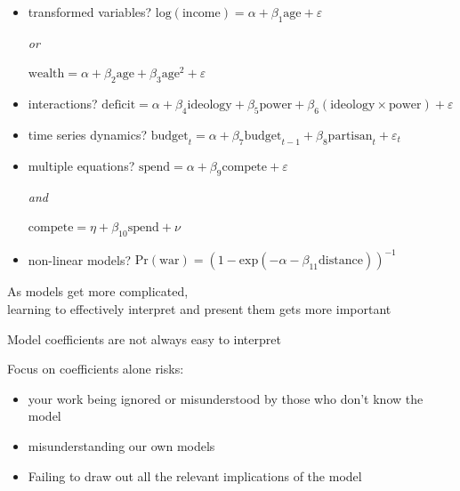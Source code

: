 \documentclass[pdflatex,landscape,titlepage]{foils}
\begin{document}
\begin{itemize}
\item transformed variables? \pause \quad 
  \color{green} $\mathrm{log}(\mathrm{income}) = \alpha +
  \beta_1\mathrm{age} + \varepsilon$  \pause

\quad \quad \quad \quad \quad  \quad \quad 
 \quad \quad \quad \quad \quad \quad \quad \quad \emph{or} 

 \quad \quad \quad \quad \quad  \quad \quad 
 \quad \quad \quad \quad $\mathrm{wealth} = \alpha + \beta_2\mathrm{age}+ \beta_3\mathrm{age}^2 + \varepsilon$
 \color{white} \pause

\item interactions? \pause \quad  \color{green}
  $\mathrm{deficit} = \alpha + \beta_4\mathrm{ideology} + \beta_5\mathrm{power} + \beta_6(\mathrm{ideology} \times
  \mathrm{power}) + \varepsilon$  \color{white} \pause

\item time series dynamics? \pause \quad  \color{green}
  $\mathrm{budget}_{t} = \alpha + \beta_7\mathrm{budget}_{t-1} +
  \beta_8\mathrm{partisan}_t + \varepsilon_t$  \color{white} \pause

\item multiple equations? \pause \quad  \color{green} $\mathrm{spend} =
  \alpha + \beta_9\mathrm{compete} + \varepsilon$ \quad \pause

\quad \quad \quad \quad \quad  \quad \quad 
 \quad \quad \quad \quad \quad \quad \quad \quad\emph{and}
 
\quad \quad
  \quad \quad \quad  \quad \quad 
  \quad \quad 
  \quad $\mathrm{compete} = \eta + 
  \beta_{10}\mathrm{spend} + \nu$  \color{white} \pause

\item non-linear models? \pause \quad  \color{green} $\mathrm{Pr(war)}
  = (1 - \mathrm{exp}(-\alpha -\beta_{11}\mathrm{distance}))^{-1}$
  \color{white} 
\end{itemize}

\bgclear

As models get more complicated, \\
learning to effectively interpret and present them gets more important

Model coefficients are not always easy to interpret

Focus on coefficients alone risks:

\begin{itemize}
\item your work being ignored or misunderstood by those who don't know the model

\item misunderstanding our own models

\item Failing to draw out all the relevant implications of the model
\end{itemize}
\end{document}

